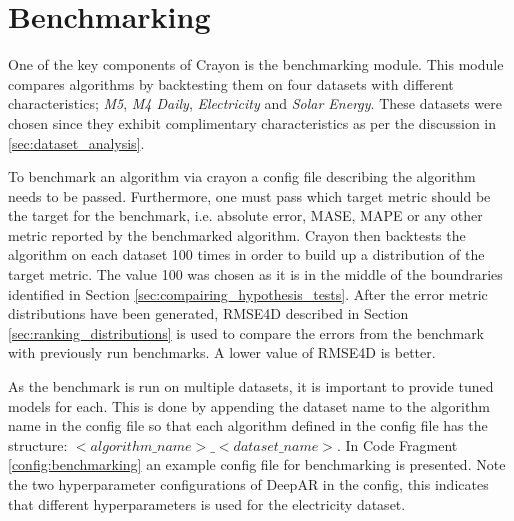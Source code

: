 \section{Benchmarking}
\label{subsec:benchmarking}
One of the key components of Crayon is the benchmarking module. This module compares algorithms by backtesting them on four datasets with different characteristics; \textit{M5}, \textit{M4 Daily}, \textit{Electricity} and \textit{Solar Energy}. These datasets were chosen since they exhibit complimentary characteristics as per the discussion in \ref{sec:dataset_analysis}.

To benchmark an algorithm via crayon a config file describing the algorithm needs to be passed. Furthermore, one must pass which target metric should be the target for the benchmark, i.e. absolute error, MASE, MAPE or any other metric reported by the benchmarked algorithm. Crayon then backtests the algorithm on each dataset 100 times in order to build up a distribution of the target metric. The value 100 was chosen as it is in the middle of the boundraries identified in Section \ref{sec:compairing_hypothesis_tests}. After the error metric distributions have been generated, RMSE4D described in Section \ref{sec:ranking_distributions} is used to compare the errors from the benchmark with previously run benchmarks. A lower value of RMSE4D is better.

As the benchmark is run on multiple datasets, it is important to provide tuned models for each. This is done by appending the dataset name to the algorithm name in the config file so that each algorithm defined in the config file has the structure: \(<algorithm\_name>\_<dataset\_name>\). In Code Fragment \ref{config:benchmarking} an example config file for benchmarking is presented. Note the two hyperparameter configurations of DeepAR in the config, this indicates that different hyperparameters is used for the electricity dataset.

